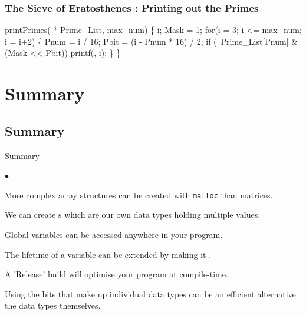 \documentclass[smaller,handout,table]{beamer}
\begin{document}
\begin{frame}[fragile]
\frametitle{The Sieve of Eratosthenes : Printing out the Primes}
\begin{semiverbatim}
\kr\kl{} printPrimes( * Prime\_List,  max\_num)
\kl\{
\kl   {} i;
\kl   {} Mask = 1;
\kl   for(i = 3; i <= max\_num; i = i+2)
\kl   \{
\kl      {} Pnum = i / 16;
\kl      {} Pbit = (i - Pnum * 16) / 2;
\kl      if (~Prime\_List[Pnum] \& (Mask << Pbit))
\kl         printf(, i);
\kl   \}
\kl\}
\end{semiverbatim}
\end{frame}

\section{Summary}
\subsection{Summary}
\begin{frame}{Summary}
\begin{list}{$\bullet$}{}
\item More complex array structures can be created with \texttt{malloc} than matrices.
\item We can create s which are our own data types holding multiple values.
\item Global variables can be accessed anywhere in your program.
\item The lifetime of a variable can be extended by making it .
\item A 'Release' build will optimise your program at compile-time.
\item Using the bits that make up individual data types can be an efficient alternative the data types themselves.
\end{list}
\end{frame}
\end{document}
